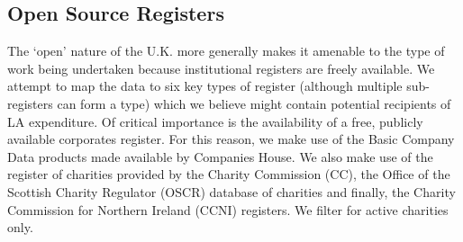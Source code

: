\documentclass[12pt]{article}
\begin{document}
\subsection{Open Source Registers}\label{registers}

The `open' nature of the U.K. more generally makes it amenable to the type of work being undertaken because institutional registers are freely available. We attempt to map the data to six key types of register (although multiple sub-registers can form a type) which we believe might contain potential recipients of LA expenditure. Of critical importance is the availability of a free, publicly available corporates register. For this reason, we make use of the Basic Company Data products made available by Companies House.  We also make use of the register of charities provided by the Charity Commission (CC), the Office of the Scottish Charity Regulator (OSCR) database of charities and finally, the Charity Commission for Northern Ireland (CCNI) registers. We filter for active charities only.
\end{document}
